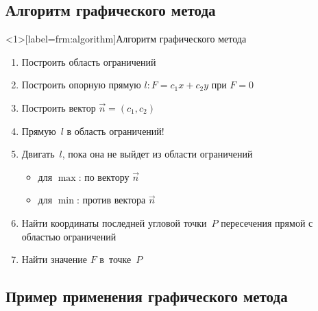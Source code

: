 \documentclass[unicode,11pt,notheorems]{beamer}
\begin{document}
\subsection{Алгоритм графического метода}
\begin{frame}<1>[label=frm:algorithm]{Алгоритм графического метода}
\begin{enumerate}
	\item Построить область ограничений
	\item Построить опорную прямую $l\colon F=c_1x+c_2y$ при $F=0$
	\item Построить вектор $\vec{n}=(c_1,c_2)$
	\item Прямую~$l$ в область ограничений!
	\item Двигать~$l$, пока она не выйдет из области ограничений
	\begin{itemize}
		\item \alert{для $\max$:} по вектору $\vec{n}$
		\item \alert{для $\min$:} против вектора $\vec{n}$
	\end{itemize}
	\item Найти координаты последней угловой точки~$P$ пересечения прямой с областью ограничений
	\item Найти значение $F$ в~точке~$P$
\end{enumerate}
\end{frame} 
   
\subsection{Пример применения графического метода}
  
\end{document}
